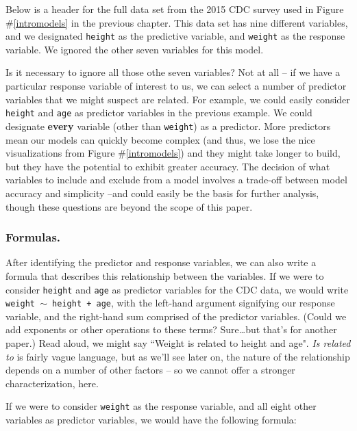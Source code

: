 \documentclass[12pt]{article}
\begin{document}
Below is a header for the full data set from the 2015 CDC survey used in Figure \#\ref{intromodels} in the previous chapter.  This data set has nine different 
variables, and we designated \texttt{height} as the predictive variable, and \texttt{weight} as the response variable.  We ignored the other seven 
variables for this model.


	Is it necessary to ignore all those othe seven variables? Not at all -- if we have a particular response variable of interest to us, we can select a number
of predictor variables that we might suspect are related.  For example, we could easily consider \texttt{height} and \texttt{age} as predictor variables in the previous example.  We could designate \textbf{every} variable (other than \texttt{weight}) as a predictor.  More predictors mean our models can quickly become complex (and thus, we lose the nice visualizations from Figure \#\ref{intromodels}) and they might take longer to build, but they have the potential
to exhibit greater accuracy.  The decision of what variables to include and exclude from a model involves a trade-off between model accuracy and simplicity --and could easily be the basis for further analysis, though these questions are beyond the scope of this paper.

	\subsubsection{Formulas.}
	After identifying the predictor and response variables, we can also write a formula that describes this relationship between the variables.
If we were to consider \texttt{height} and \texttt{age} as predictor variables for the CDC data, we would write \texttt{weight $\sim$ height + age}, with the left-hand argument signifying our response variable, and the right-hand sum comprised of the predictor variables.  (Could we add exponents or other operations to these terms?  Sure\dots but that's for another paper.)  Read aloud, we might say ``Weight is related to height and age". \textit{Is related to} is fairly vague language, but as we'll see later on, the nature of the relationship depends on a number of other factors -- so we cannot offer a stronger characterization, here.

	If we were to consider \texttt{weight} as the response variable, and all eight other variables as predictor variables, we would have the following formula:
\end{document}

